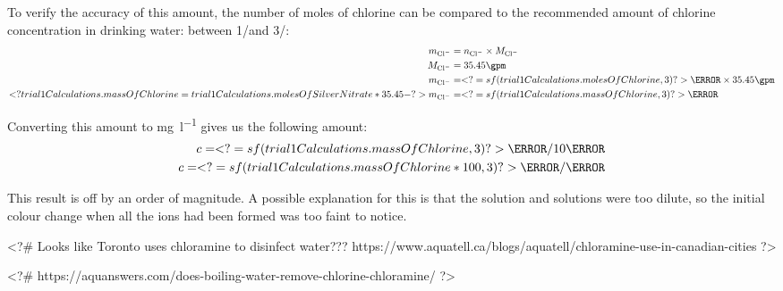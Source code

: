 \documentclass[12pt, demo]{article}
\begin{document}
To verify the accuracy of this amount, the number of moles of chlorine can be compared to the recommended amount of chlorine concentration in drinking water: between 1\mg/\litre and 3\mg/\litre:
%
\begin{align*}
	m_{\ce{Cl^-}} & = n_{\ce{Cl^-}} \times M_{\ce{Cl^-}}
	\\
	M_{\ce{Cl^-}} & = 35.45\gpm
	\\
	m_{\ce{Cl^-}} & = <?= sf(trial1Calculations.molesOfChlorine, 3) ?>\mmol \times 35.45\gpm
	\\
	<? trial1Calculations.massOfChlorine = trial1Calculations.molesOfSilverNitrate * 35.45 -?>
	m_{\ce{Cl^-}} & = <?= sf(trial1Calculations.massOfChlorine, 3) ?>\mg
\end{align*}

Converting this amount to \si{\mg\per\litre} gives us the following amount:
%
\begin{align*}
	c = <?= sf(trial1Calculations.massOfChlorine, 3) ?>\mg/10\ml
	\\
	c = <?= sf(trial1Calculations.massOfChlorine * 100, 3) ?>\mg/\litre
\end{align*}

This result is off by an order of magnitude. A possible explanation for this is that the  solution and  solutions were too dilute, so the initial colour change when all the  ions had been formed was too faint to notice.

<?#
Looks like Toronto uses chloramine to disinfect water???
https://www.aquatell.ca/blogs/aquatell/chloramine-use-in-canadian-cities
?>

<?#
https://aquanswers.com/does-boiling-water-remove-chlorine-chloramine/
?>
\end{document}
